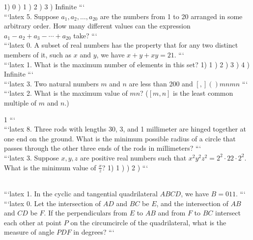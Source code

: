 1) 0 ) 1 ) 2 ) 3 ) Infinite
```
\\
```latex
5. Suppose $a_1, a_2, \ldots, a_{20}$ are the numbers from 1 to 20 arranged in some arbitrary order. How many different values can the expression $a_1 - a_2 + a_3 - \cdots + a_{20}$ take?
```
\\
```latex
0. A subset of real numbers has the property that for any two distinct members of it, such as $x$ and $y$, we have $x + y + xy = 21$.
```
\\
```latex
1. What is the maximum number of elements in this set?  
1) 1 ) 2 ) 3 ) 4 ) Infinite
```
\\
```latex
3. Two natural numbers $m$ and $n$ are less than 200 and $[ , ] ( )m n m n$
```
\\
```latex
2. What is the maximum value of $mn$? ($[m, n]$ is the least common multiple of $m$ and $n$.)

1
```
\\
```latex
8. Three rods with lengths 30, 3, and 1 millimeter are hinged together at one end on the ground. What is the minimum possible radius of a circle that passes through the other three ends of the rods in millimeters?
```
\\
```latex
3. Suppose $x, y, z$ are positive real numbers such that $x^2 y^2 z^2 = 2^2 \cdot 22 \cdot 2^2$. What is the minimum value of $\frac{x}{z}$? 
1) 1 )  ) 2 ) 
```

\\
```latex
1. In the cyclic and tangential quadrilateral $ABCD$, we have $B = 011$.
```
\\
```latex
0. Let the intersection of $AD$ and $BC$ be $E$, and the intersection of $AB$ and $CD$ be $F$. If the perpendiculars from $E$ to $AB$ and from $F$ to $BC$ intersect each other at point $P$ on the circumcircle of the quadrilateral, what is the measure of angle $PDF$ in degrees?
```

